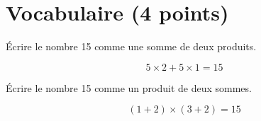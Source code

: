 \section{Vocabulaire (4 points)}

\begin{questions}
	\question[2] \'Ecrire le nombre 15 comme une somme de deux produits.
	\begin{solution}
		\begin{equation*}
			5 \times 2 + 5 \times 1 = 15
		\end{equation*}
	\end{solution}
	
	\question[2] \'Ecrire le nombre 15 comme un produit de deux sommes.
	
	\begin{solution}
		\begin{equation*}
		(1 + 2) \times (3 + 2) = 15
		\end{equation*}
	\end{solution}
	
\end{questions}